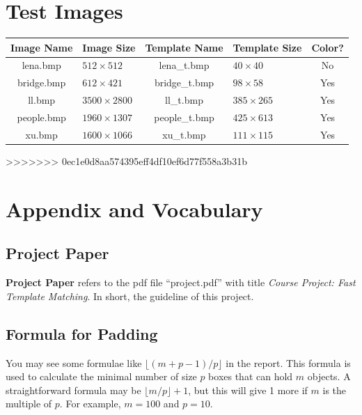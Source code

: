 \documentclass[12pt, a4paper]{article}
\begin{document}
\section{Test Images}
  \begin{tabular}{|c|l|c|l|c|}
    \hline
    Image Name & Image Size       & Template Name & Template Size  & Color? \\\hline
    lena.bmp   & $512\times512$   & lena\_t.bmp   & $40\times40$   & No     \\\hline
    bridge.bmp & $612\times421$   & bridge\_t.bmp & $98\times58$   & Yes    \\\hline
    ll.bmp     & $3500\times2800$ & ll\_t.bmp     & $385\times265$ & Yes    \\\hline
    people.bmp & $1960\times1307$ & people\_t.bmp & $425\times613$ & Yes    \\\hline
    xu.bmp     & $1600\times1066$ & xu\_t.bmp     & $111\times115$ & Yes    \\\hline
  \end{tabular}

>>>>>>> 0ec1e0d8aa574395eff4df10ef6d77f558a3b31b
\section{Appendix and Vocabulary}
  \subsection{Project Paper}
    \textbf{Project Paper} refers to the pdf file ``project.pdf'' with title
    \textit{Course Project: Fast Template Matching}. In short, the guideline
    of this project.
  \subsection{Formula for Padding}
    You may see some formulae like $\lfloor(m+p-1)/p\rfloor$ in the report. This
    formula is used to calculate the minimal number of size $p$ boxes that can
    hold $m$ objects. A straightforward formula may be $\lfloor m/p\rfloor+1$,
    but this will give 1 more if $m$ is the multiple of $p$. For example, $m=100$
    and $p=10$.
\end{document}
